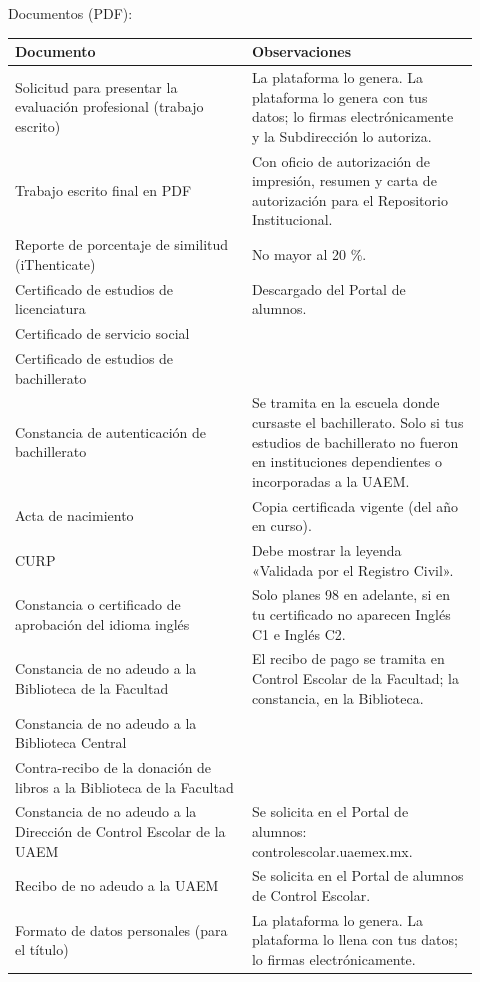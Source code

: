 Documentos (PDF):
{\small\begin{longtable}{>{\raggedright\arraybackslash}p{0.47\linewidth}>{\raggedright\arraybackslash}p{0.45\linewidth}}
\toprule
\textbf{Documento} & \textbf{Observaciones}\\
\midrule
\endhead
Solicitud para presentar la evaluación profesional (trabajo escrito) & La plataforma lo genera. La plataforma lo genera con tus datos; lo firmas electrónicamente y la Subdirección lo autoriza.\\
Trabajo escrito final en PDF & Con oficio de autorización de impresión, resumen y carta de autorización para el Repositorio Institucional.\\
Reporte de porcentaje de similitud (iThenticate) & No mayor al 20 \%.\\
Certificado de estudios de licenciatura & Descargado del Portal de alumnos.\\
Certificado de servicio social & \\
Certificado de estudios de bachillerato & \\
Constancia de autenticación de bachillerato & Se tramita en la escuela donde cursaste el bachillerato. Solo si tus estudios de bachillerato no fueron en instituciones dependientes o incorporadas a la UAEM.\\
Acta de nacimiento & Copia certificada vigente (del año en curso).\\
CURP & Debe mostrar la leyenda «Validada por el Registro Civil».\\
Constancia o certificado de aprobación del idioma inglés & Solo planes 98 en adelante, si en tu certificado no aparecen Inglés C1 e Inglés C2.\\
Constancia de no adeudo a la Biblioteca de la Facultad & El recibo de pago se tramita en Control Escolar de la Facultad; la constancia, en la Biblioteca.\\
Constancia de no adeudo a la Biblioteca Central & \\
Contra-recibo de la donación de libros a la Biblioteca de la Facultad & \\
Constancia de no adeudo a la Dirección de Control Escolar de la UAEM & Se solicita en el Portal de alumnos: controlescolar.uaemex.mx.\\
Recibo de no adeudo a la UAEM & Se solicita en el Portal de alumnos de Control Escolar.\\
Formato de datos personales (para el título) & La plataforma lo genera. La plataforma lo llena con tus datos; lo firmas electrónicamente.\\

\end{longtable}}
